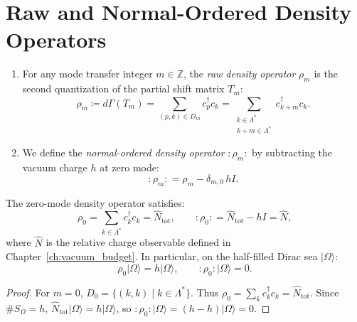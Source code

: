\section{Raw and Normal-Ordered Density Operators}

\begin{definition}
\begin{enumerate}
    \item For any mode transfer integer $m \in \mathbb{Z}$, the \emph{raw density operator} $\rho_m$ is the second quantization of the partial shift matrix $T_m$:
    \begin{equation}
    \rho_m \coloneqq d\Gamma(T_m) = \sum_{(p, k) \in D_m} c_p^\dagger c_k = \sum_{\substack{k \in \Lambda^* \\ k+m \in \Lambda^*}} c_{k+m}^\dagger c_k.
    \end{equation}
    \item We define the \emph{normal-ordered density operator} $:\!\rho_m\!:$ by subtracting the vacuum charge $h$ at zero mode:
    \begin{equation}
    :\!\rho_m\!: = \rho_m - \delta_{m, 0}\, h I.
    \end{equation}
\end{enumerate}
\end{definition}

\begin{proposition}
The zero-mode density operator satisfies:
\begin{equation}
\rho_0 = \sum_{k \in \Lambda^*} c_k^\dagger c_k = \hat{N}_{\mathrm{tot}}, \qquad :\!\rho_0\!: = \hat{N}_{\mathrm{tot}} - h I = \hat{N},
\end{equation}
where $\hat{N}$ is the relative charge observable defined in Chapter~\ref{ch:vacuum_budget}.
In particular, on the half-filled Dirac sea $|\Omega\rangle$:
\begin{equation}
\rho_0 |\Omega\rangle = h |\Omega\rangle, \qquad :\!\rho_0\!: |\Omega\rangle = 0.
\end{equation}
\end{proposition}

\begin{proof}
For $m = 0$, $D_0 = \{(k, k) \mid k \in \Lambda^*\}$. Thus $\rho_0 = \sum_k c_k^\dagger c_k = \hat{N}_{\mathrm{tot}}$. Since $\#S_\Omega = h$, $\hat{N}_{\mathrm{tot}} |\Omega\rangle = h |\Omega\rangle$, so $:\!\rho_0\!: |\Omega\rangle = (h - h)|\Omega\rangle = 0$.
\end{proof}


